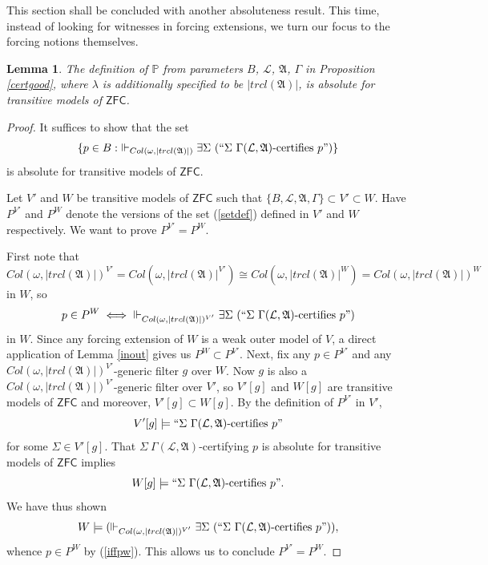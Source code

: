\documentclass[12pt, twoside]{memoir}
\numberwithin{equation}{section}
\newtheorem{lem}[thm]{Lemma}
\theoremstyle{definition}
\theoremstyle{remark}
\theoremstyle{definition}
\theoremstyle{definition}
\theoremstyle{definition}
\theoremstyle{remark}
\begin{document}
This section shall be concluded with another absoluteness result. This time, instead of looking for witnesses in forcing extensions, we turn our focus to the forcing notions themselves.

\begin{lem}\label{Pisabs}
The definition of $\mathbb{P}$ from parameters $B$, $\mathcal{L}$, $\mathfrak{A}$, $\Gamma$ in Proposition \ref{certgood}, where $\lambda$ is additionally specified to be $|trcl(\mathfrak{A})|$, is absolute for transitive models of $\mathsf{ZFC}$.
\end{lem}

\begin{proof}
It suffices to show that the set 
\begin{equation}\label{setdef}
    \{p \in B : \ \Vdash_{Col(\omega, |trcl(\mathfrak{A})|)} \exists \Sigma \ (``\Sigma \ \Gamma(\mathcal{L}, \mathfrak{A}) \text{-certifies } p")\}
\end{equation}
is absolute for transitive models of $\mathsf{ZFC}$. 

Let $V'$ and $W$ be transitive models of $\mathsf{ZFC}$ such that $\{B, \mathcal{L}, \mathfrak{A}, \Gamma\} \subset V' \subset W$. Have $P^{V'}$ and $P^W$ denote the versions of the set (\ref{setdef}) defined in $V'$ and $W$ respectively. We want to prove $P^{V'} = P^W$. 

First note that $$ Col(\omega, |trcl(\mathfrak{A})|)^{V'} = Col(\omega, |trcl(\mathfrak{A})|^{V'}) \cong Col(\omega, |trcl(\mathfrak{A})|^W) = Col(\omega, |trcl(\mathfrak{A})|)^W$$ in $W$, so 
\begin{equation}\label{iffpw}
    p \in P^W \iff \ \Vdash_{Col(\omega, |trcl(\mathfrak{A})|)^{V'}} \exists \Sigma \ (``\Sigma \ \Gamma(\mathcal{L}, \mathfrak{A}) \text{-certifies } p")
\end{equation}
in $W$. Since any forcing extension of $W$ is a weak outer model of $V$, a direct application of Lemma \ref{inout} gives us $P^W \subset P^{V'}$. Next, fix any $p \in P^{V'}$ and any $Col(\omega, |trcl(\mathfrak{A})|)^{V'}$-generic filter $g$ over $W$. Now $g$ is also a $Col(\omega, |trcl(\mathfrak{A})|)^{V'}$-generic filter over $V'$, so $V'[g]$ and $W[g]$ are transitive models of $\mathsf{ZFC}$ and moreover, $V'[g] \subset W[g]$. By the definition of $P^{V'}$ in $V'$, $$V'[g] \models ``\Sigma \ \Gamma(\mathcal{L}, \mathfrak{A}) \text{-certifies } p"$$ for some $\Sigma \in V'[g]$. That $\Sigma \ \Gamma(\mathcal{L}, \mathfrak{A})$-certifying $p$ is absolute for transitive models of $\mathsf{ZFC}$ implies $$W[g] \models ``\Sigma \ \Gamma(\mathcal{L}, \mathfrak{A}) \text{-certifies } p".$$ We have thus shown $$W \models (\Vdash_{Col(\omega, |trcl(\mathfrak{A})|)^{V'}} \exists \Sigma \ (``\Sigma \ \Gamma(\mathcal{L}, \mathfrak{A}) \text{-certifies } p")),$$ whence $p \in P^W$ by (\ref{iffpw}). This allows us to conclude $P^{V'} = P^W$.
\end{proof}
\end{document}
